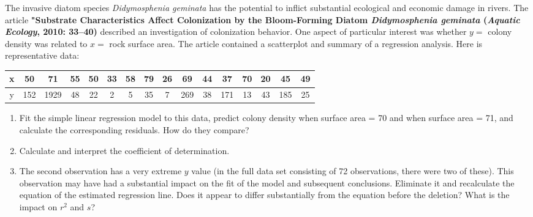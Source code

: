\documentclass[11pt,letterpaper,boxed]{hmcpset}
\begin{document}
\begin{solution}
	\vfill
\end{solution}
\newpage


\begin{problem}[12.2.24]
	The invasive diatom species \textit{Didymosphenia geminata} has the potential to inflict substantial ecological and economic damage in rivers. The article \textbf{"Substrate Characteristics Affect Colonization by the Bloom-Forming Diatom \emph{Didymosphenia geminata} (\emph{Aquatic Ecology}, 2010: 33--40)} described an investigation of colonization behavior. One aspect of particular interest was whether $y =$ colony density was related to $x =$ rock surface area. The article contained a scatterplot and summary of a regression analysis. Here is representative data:
	\begin{center}
	\begin{tabular}{c | c c c c c c c c c c c c c c c}
		x & 50 & 71 & 55 & 50 & 33 & 58 & 79 & 26 & 69 & 44 & 37 & 70 & 20 & 45 & 49\\
		\hline
		y & 152 & 1929 & 48 & 22 & 2 & 5 & 35 & 7 & 269 & 38 & 171 & 13 & 43 & 185 & 25\\
	\end{tabular}
	\end{center}
	\begin{enumerate}
		\item
			Fit the simple linear regression model to this data, predict colony density when surface area = 70 and when surface area = 71, and calculate the corresponding residuals. How do they compare?
		\item
		 	Calculate and interpret the coefficient of determination.
		\item
		 	The second observation has a very extreme $y$ value (in the full data set consisting of 72 observations, there were two of these). This observation may have had a substantial impact on the fit of the model and subsequent conclusions. Eliminate it and recalculate the equation of the estimated regression line. Does it appear to differ substantially from the equation before the deletion? What is the impact on $r^2$ and $s$?
	\end{enumerate}
\end{problem}

\begin{solution}
	\vfill
\end{solution}
\newpage
\end{document}
